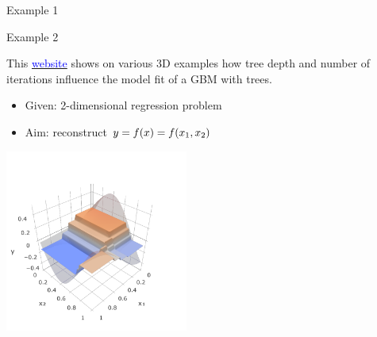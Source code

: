 \begin{frame}{Example 1}
\begin{center}
\end{center}

\end{frame}

\begin{vbframe}{Example 2}

This \href{http://arogozhnikov.github.io/2016/06/24/gradient_boosting_explained.html}{\textcolor{blue}{website}} shows on various 3D examples how tree depth and number of iterations influence the model fit of a GBM with trees. 
\begin{itemize}
  \item Given: 2-dimensional regression problem
  \item Aim: reconstruct $ y = f(x) = f (x_1, x_2) $
\end{itemize}

\begin{center}
\includegraphics[width=0.45\textwidth]{figure_man/gbm_anim/gbm_tree_anim_depth_2_target_3.png}
\end{center}



\end{vbframe}

